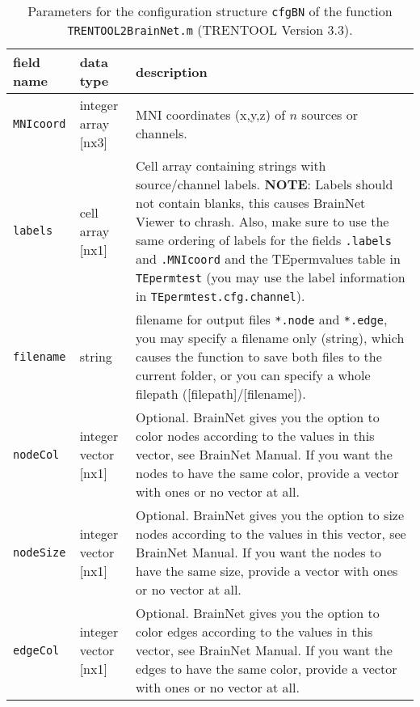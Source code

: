 \begin{table}[H]
\small \centering
\caption[Parameters \texttt{cfgBN}]{Parameters for the configuration structure \texttt{cfgBN} of the function \texttt{TRENTOOL2BrainNet.m} (TRENTOOL Version 3.3).} 
\begin{tabularx}{\textwidth}{p{2cm}L{2.5cm}X} \toprule
\textbf{field name} & \textbf{data type} & \textbf{description} \\ \midrule
\verb+MNIcoord+ & integer array [nx3] & MNI coordinates (x,y,z) of $n$ sources or channels.\\
\verb+labels+ & cell array [nx1] & Cell array containing strings with source/channel labels. \textbf{NOTE}: Labels should not contain blanks, this causes BrainNet Viewer to chrash. Also, make sure to use the same ordering of labels for the fields \texttt{.labels} and \texttt{.MNIcoord} and the TEpermvalues table in \texttt{TEpermtest} (you may use the label information in \texttt{TEpermtest.cfg.channel}).\\
\verb+filename+ & string & filename for output files \texttt{*.node} and \texttt{*.edge}, you may specify a filename only (string), which causes the function to save both files to the current folder, or you can specify a whole filepath ([filepath]/[filename]).\\
\verb+nodeCol+ & integer vector [nx1] & Optional. BrainNet gives you the option to color nodes according to the values in this vector, see BrainNet Manual. If you want the nodes to have the same color, provide a vector with ones or no vector at all.\\ 
\verb+nodeSize+ & integer vector [nx1] & Optional. BrainNet gives you the option to size nodes according to the values in this vector, see BrainNet Manual. If you want the nodes to have the same size, provide a vector with ones or no vector at all.\\ 
\verb+edgeCol+ & integer vector [nx1] & Optional. BrainNet gives you the option to color edges according to the values in this vector, see BrainNet Manual. If you want the edges to have the same color, provide a vector with ones or no vector at all.\\ \bottomrule
\end{tabularx} \label{tab:cfgBN}
\end{table}

